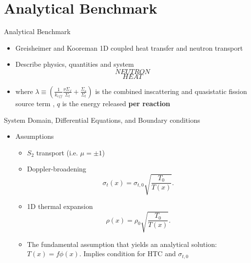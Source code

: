 \documentclass[9pt,t]{beamer}
\begin{document}
\section{Analytical Benchmark}
\begin{frame}{Analytical Benchmark}
    \begin{itemize}
        \item Greisheimer and Kooreman 1D coupled heat transfer and neutron transport \cite{analytical-benchmark}
        \item Describe physics, quantities and system
        \begin{equation}
                NEUTRON
        \end{equation}
        \begin{equation}
                HEAT
        \end{equation}
        \item where $\lambda \equiv (\frac{1}{k_{eff}}\frac{\nu \Sigma_{f}}{\Sigma_{t}} + \frac{\Sigma_{s}}{\Sigma_{t}} )$ is 
        the combined inscattering and quasistatic fission source term \cite{analytical-benchmark}, $q$ is the energy released
        \textbf{per reaction}
    \end{itemize}
\end{frame}

\begin{frame}{System Domain, Differential Equations, and Boundary conditions}
    \begin{itemize}
        \item Assumptions
        \begin{itemize}
            \item $S_{2}$ transport (i.e. $\mu=\pm 1$)
            \item Doppler-broadening
            \begin{equation}
                \sigma_{t}(x) = \sigma_{t,0}\sqrt{\frac{T_{0}}{T(x)}}.
            \end{equation}
            \item 1D thermal expansion
            \begin{equation} \label{sec:intro:density}
                \rho(x) =  \rho_{0} \sqrt{\frac{T_{0}}{T(x)}}.
            \end{equation}
            \item The fundamental assumption that yields an analytical solution: $T(x)=f\phi(x)$. Implies condition for HTC and $\sigma_{t,0}$
        \end{itemize}
    \end{itemize}
\end{frame}
\end{document}
